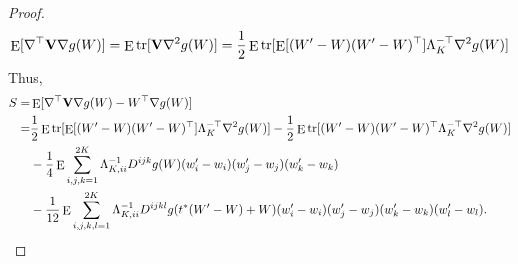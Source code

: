 \documentclass[11pt]{article}
\DeclareMathOperator{\mytr}{tr}
\DeclareMathOperator{\myE}{E}
\theoremstyle{plain}
\theoremstyle{definition}
\theoremstyle{remark}
\begin{document}
\begin{appendices}
\begin{proof}
\begin{equation*}
    \myE [\nabla^\top \BV \nabla g(W)] 
    =
    \myE \mytr [\BV \nabla^2 g(W)] 
    =
    \frac 1 2 \myE \mytr [ \myE [(W'-W)(W'-W)^\top] \Lambda_K^{-\top} \nabla^2 g(W)] 
\end{equation*}
Thus,
\begin{equation*}
    \begin{split}
    S=&\myE [\nabla^\top \BV \nabla g(W) -W^\top \nabla g(W)]\\
    =
&
    \frac 1 2 \myE \mytr [ \myE [(W'-W)(W'-W)^\top] \Lambda_K^{-\top} \nabla^2 g(W)] 
         -\frac 1 2 
\myE
         \mytr
         [
         (W'-W)
         (W'-W)^\top \Lambda_K^{-\top} \nabla^2 g(W)
     ]
     \\
         &-
         \frac 1 4 \myE
         \sum_{i,j,k=1}^{2K}
         \Lambda_{K,ii}^{-1} D^{ijk} g(W) (w_i'-w_i) (w_j'-w_j)(w_k'-w_k)
         \\
         &-
         \frac{1}{12} \myE
         \sum_{i,j,k,l=1}^{2K}
         \Lambda_{K,ii}^{-1} D^{ijkl} g(t^*(W'-W)+W) (w_i'-w_i) (w_j'-w_j)(w_k'-w_k) (w_l'-w_l).
    \end{split}
\end{equation*}


\end{proof}

\end{appendices}





\end{document}

